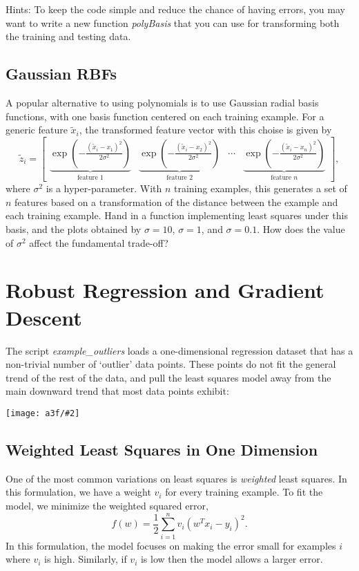 \documentclass{article}
\def\blu#1{{\color{blu}#1}}
\newcommand{\mat}[1]{\begin{bmatrix}#1\end{bmatrix}}
\newcommand{\centerfig}[2]{\begin{center}\texttt{[image: a3f/\#2]}\end{center}}
\begin{document}
Hints: To keep the code simple and reduce the chance of having errors, you may want to write a new function \emph{polyBasis} that you can use for transforming both the training and testing data.

\pagebreak

\subsection{Gaussian RBFs}

A popular alternative to using polynomials is to use Gaussian radial basis functions, with one basis function centered on each training example. For a generic feature $\tilde{x}_i$, the transformed feature vector with this choise is given by
\[
\tilde{z}_i = \mat{\underbrace{\exp\left(-\frac{(\tilde{x}_i - x_1)^2}{2\sigma^2}\right)}_\text{feature 1} & \underbrace{\exp\left(-\frac{(\tilde{x}_i - x_2)^2}{2\sigma^2}\right)}_\text{feature 2} & \cdots & \underbrace{\exp\left(-\frac{(\tilde{x}_i - x_n)^2}{2\sigma^2}\right)}_\text{feature $n$}},
\]
where $\sigma^2$ is a hyper-parameter. With $n$ training examples, this generates a set of $n$ features based on a transformation of the distance between the example and each training example. \blu{Hand in a function implementing least squares under this basis, and the plots obtained by $\sigma=10$, $\sigma=1$, and $\sigma=0.1$. How does the value of $\sigma^2$ affect the fundamental trade-off?}


\pagebreak

\section{Robust Regression and Gradient Descent}

The script \emph{example\_outliers} loads a one-dimensional regression dataset that has a non-trivial number of `outlier' data points. These points do not fit the general trend of the rest of the data, and pull the least squares model away from the main downward trend that most data points exhibit:
\centerfig{.7}{outliers}



\pagebreak

\subsection{Weighted Least Squares in One Dimension}

One of the most common variations on least squares is \emph{weighted} least squares. In this formulation, we have a weight $v_i$ for every training example. To fit the model, we minimize the weighted squared error,
\[
f(w) =  \frac{1}{2}\sum_{i=1}^n v_i(w^Tx_i - y_i)^2.
\]
In this formulation, the model focuses on making the error small for examples $i$ where $v_i$ is high. Similarly, if $v_i$ is low then the model allows a larger error.
\end{document}
